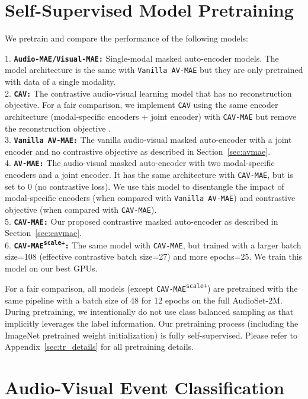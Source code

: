 \documentclass{article} \usepackage{iclr2023_conference,times}
\begin{document}
\section{Self-Supervised Model Pretraining}

We pretrain and compare the performance of the following models:

1. \textbf{\texttt{Audio-MAE/Visual-MAE:}} Single-modal masked auto-encoder models. The model architecture is the same with \texttt{Vanilla AV-MAE} but they are only pretrained with data of a single modality.\\
2. \textbf{\texttt{CAV:}} The contrastive audio-visual learning model that has no reconstruction objective. For a fair comparison, we implement \texttt{CAV} using the same encoder architecture (modal-specific encoders + joint encoder) with \texttt{CAV-MAE} but remove the reconstruction objective . \\
3. \textbf{\texttt{Vanilla AV-MAE:}} The vanilla audio-visual masked auto-encoder with a joint encoder and no contrastive objective as described in Section~\ref{sec:avmae}. \\
4. \textbf{\texttt{AV-MAE:}} The audio-visual masked auto-encoder with two modal-specific encoders and a joint encoder. It has the same architecture with \texttt{CAV-MAE}, but  is set to 0 (no contrastive loss). We use this model to disentangle the impact of modal-specific encoders (when compared with \texttt{Vanilla AV-MAE}) and contrastive objective (when compared with \texttt{CAV-MAE}). \\
5. \textbf{\texttt{CAV-MAE:}} Our proposed contrastive masked auto-encoder as described in Section~\ref{sec:cavmae}. \\
6. \textbf{\texttt{CAV-MAE\textsuperscript{scale+}:}} The same model with \texttt{CAV-MAE}, but trained with a larger batch size=108 (effective contrastive batch size=27) and more epochs=25. We train this model on our best GPUs. 

For a fair comparison, all models (except {\texttt{CAV-MAE\textsuperscript{scale+}}}) are pretrained with the same pipeline with a batch size of 48 for 12 epochs on the full AudioSet-2M. During pretraining, we intentionally do not use class balanced sampling as that implicitly leverages the label information. Our pretraining process (including the ImageNet pretrained weight initialization) is fully self-supervised. Please refer to Appendix~\ref{sec:tr_details} for all pretraining details.

\section{Audio-Visual Event Classification}
\end{document}
